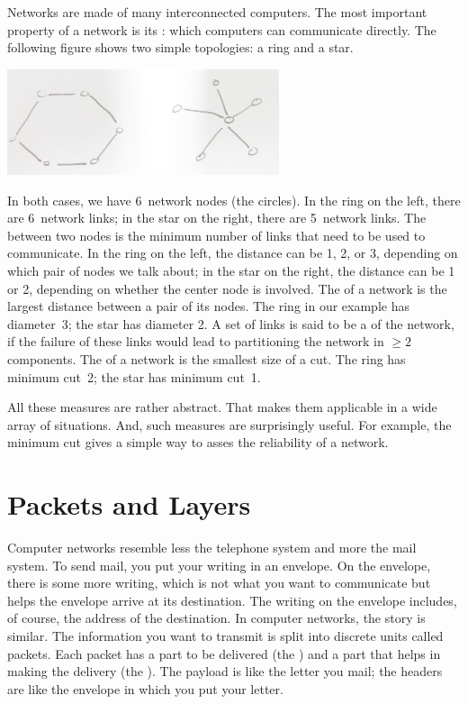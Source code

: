 Networks are made of many interconnected computers.
The most important property of a network is its :
  which computers can communicate directly.
The following figure shows two simple topologies: a ring and a star.
\begin{center}
\includegraphics[width=0.6\textwidth]{ring-star.jpg}
\end{center}
In both cases, we have 6~network nodes (the circles).
In the ring on the left, there are 6~network links;
in the star on the right, there are 5~network links.
The  between two nodes is the minimum number of links
  that need to be used to communicate.
In the ring on the left,
  the distance can be 1, 2, or 3, depending on which pair of nodes we talk about;
in the star on the right,
  the distance can be 1 or 2, depending on whether the center node is involved.
The  of a network is the largest distance between a pair of its nodes.
The ring in our example has diameter~3;
the star has diameter 2.
A set of links is said to be a  of the network,
  if the failure of these links would lead to partitioning the network
    in $\ge2$ components.
The  of a network is the smallest size of a cut.
The ring has minimum cut~2;
  the star has minimum cut~1.

All these measures are rather abstract.
That makes them applicable in a wide array of situations.
And, such measures are surprisingly useful.
For example,
  the minimum cut gives a simple way to asses the reliability of a network.

\section*{Packets and Layers}

Computer networks resemble less the telephone system and more the mail system.
To send mail, you put your writing in an envelope.
On the envelope, there is some more writing,
  which is not what you want to communicate
  but helps the envelope arrive at its destination.
The writing on the envelope includes, of course,
  the address of the destination.
In computer networks, the story is similar.
The information you want to transmit is split into discrete units called packets.
Each packet has a part to be delivered (the )
  and a part that helps in making the delivery (the ).
The payload is like the letter you mail;
  the headers are like the envelope in which you put your letter.

